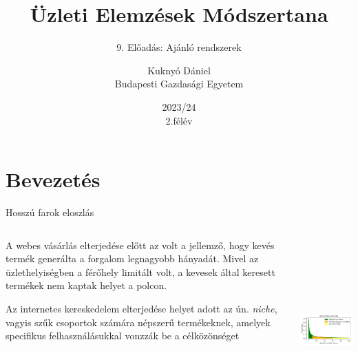\documentclass[english, aspectratio=169]{beamer}
\makeatletter
\newcommand\makebeamertitle{\frame{\maketitle}}
\let\origtableofcontents=\tableofcontents
\def\tableofcontents{\@ifnextchar[{\origtableofcontents}{\gobbletableofcontents}}
\def\gobbletableofcontents#1{\origtableofcontents}
\makeatother
\begin{document}
\section{Bevezetés}
\title[]{Üzleti Elemzések Módszertana}
\subtitle{9. Előadás: Ajánló rendszerek}
\author[Kuknyó Dániel]{Kuknyó Dániel\\Budapesti Gazdasági Egyetem}
\date{2023/24\\2.félév}
\makebeamertitle

\begin{frame}
\tableofcontents{}
\end{frame}

\begin{frame}
\tableofcontents[currentsection]
\end{frame}

\begin{frame}{Hosszú farok eloszlás}
\begin{columns}
\begin{column}{.5\textwidth}
A webes vásárlás elterjedése előtt az volt a jellemző, hogy kevés termék generálta a forgalom legnagyobb hányadát. Mivel az üzlethelyiségben a férőhely limitált volt, a kevesek által keresett termékek nem kaptak helyet a polcon.\par\medskip
Az internetes kereskedelem elterjedése helyet adott az ún. \emph{niche}, vagyis szűk csoportok számára népszerű termékeknek, amelyek specifikus felhasználásukkal vonzzák be a célközönséget
\end{column}
\begin{column}{.5\textwidth}
\begin{center}
\includegraphics[width=7cm, height=7cm, keepaspectratio]{images/recommender_1.png}
\end{center}
\end{column}
\end{columns}
\end{frame}
\end{document}
